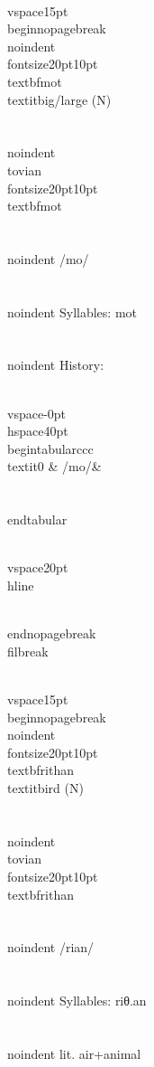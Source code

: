 \\vspace{15pt}
\\begin{nopagebreak}
\\noindent{\\fontsize{20pt}{10pt}\\textbf{mot} } \\textit{big/large} (N)\\\\
\\noindent {\\tovian \\fontsize{20pt}{10pt} \\textbf{mot} }\\\\
\\noindent /m{\textprimstress}o{}/\\\\
\\noindent Syllables: mot\\\\


\\noindent History:

\\vspace{-0pt}
\\hspace{40pt}
\\begin{tabular}{ccc}
\\textit{0} & /mo{}/& \\\\
\\end{tabular}

\\vspace{20pt}\\hline

\\end{nopagebreak}
\\filbreak



\\vspace{15pt}
\\begin{nopagebreak}
\\noindent{\\fontsize{20pt}{10pt}\\textbf{rithan} } \\textit{bird} (N)\\\\
\\noindent {\\tovian \\fontsize{20pt}{10pt} \\textbf{rithan} }\\\\
\\noindent /r{\textprimstress}i{\texttheta}an/\\\\
\\noindent Syllables: riθ.an\\\\
\\noindent lit. air+animal\\\\


